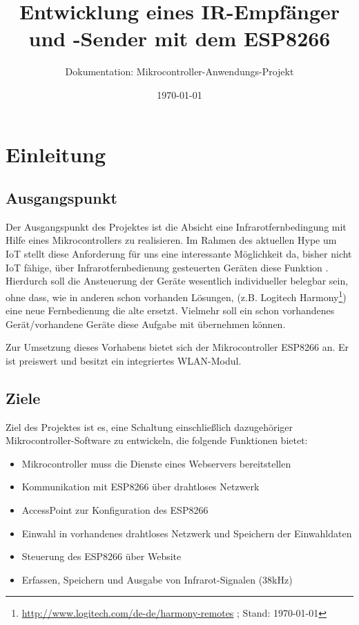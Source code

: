 						




\title{Entwicklung eines IR-Empfänger und -Sender mit dem ESP8266}
\subtitle{Dokumentation: Mikrocontroller-Anwendungs-Projekt}
\author{} %
\date{\today}

\maketitle

\tableofcontents										%
\pagebreak

\section{Einleitung}
\subsection{Ausgangspunkt}
Der Ausgangspunkt des Projektes ist die Absicht eine Infrarotfernbedingung mit Hilfe eines Mikrocontrollers zu realisieren. Im Rahmen des aktuellen Hype um \acs{IoT} stellt diese Anforderung für uns eine interessante Möglichkeit da, bisher nicht \acs{IoT} fähige, über Infrarotfernbedienung gesteuerten Geräten diese Funktion . Hierdurch soll die Ansteuerung der Geräte wesentlich individueller belegbar sein, ohne dass, wie in anderen schon vorhanden Lösungen, (z.B. Logitech Harmony\footnote{ \url{http://www.logitech.com/de-de/harmony-remotes} ; Stand: \today}) eine neue Fernbedienung die alte ersetzt. Vielmehr soll ein schon vorhandenes Gerät/vorhandene Geräte diese Aufgabe mit übernehmen können.

Zur Umsetzung dieses Vorhabens bietet sich der Mikrocontroller ESP8266 an.
Er ist preiswert und besitzt ein integriertes WLAN-Modul.

\subsection{Ziele}
Ziel des Projektes ist es, eine Schaltung einschließlich dazugehöriger Mikrocontroller-Software zu entwickeln, die folgende Funktionen bietet:

\begin{itemize}
	\item Mikrocontroller muss die Dienste eines Webservers bereitstellen
	\item Kommunikation mit ESP8266 über drahtloses Netzwerk
	\item AccessPoint zur Konfiguration des ESP8266
	\item Einwahl in vorhandenes drahtloses Netzwerk und Speichern der Einwahldaten
	\item Steuerung des ESP8266 über Website
	\item Erfassen, Speichern und Ausgabe von Infrarot-Signalen (38kHz)
\end{itemize}

